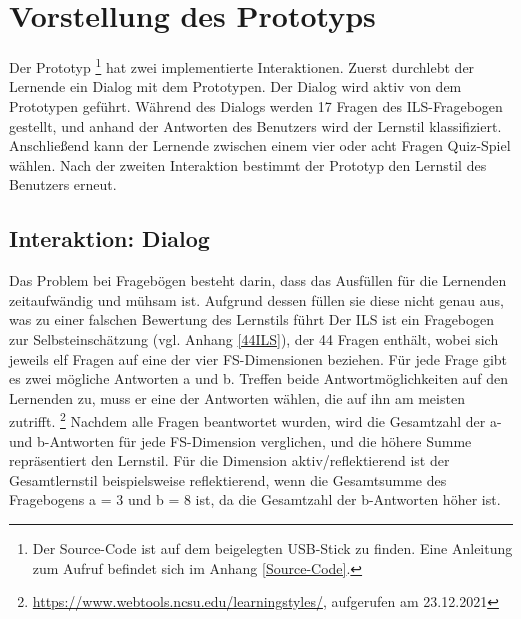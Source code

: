 \section{Vorstellung des Prototyps}  \label{VorstellungPrototyp}

Der Prototyp \footnote{Der Source-Code ist auf dem beigelegten USB-Stick zu finden. Eine Anleitung zum Aufruf befindet sich im  Anhang \ref{Source-Code}.} hat zwei implementierte Interaktionen. Zuerst durchlebt der Lernende ein Dialog mit dem Prototypen.
Der Dialog wird aktiv von dem Prototypen geführt. Während des Dialogs werden 17 Fragen des ILS-Fragebogen gestellt, und 
anhand der Antworten des Benutzers wird der Lernstil klassifiziert. 
Anschließend kann der Lernende zwischen einem vier oder acht Fragen Quiz-Spiel wählen. Nach der zweiten Interaktion
bestimmt der Prototyp den Lernstil des Benutzers erneut.

\subsection{Interaktion: Dialog}
Das Problem bei Fragebögen besteht darin,
dass das Ausfüllen für die Lernenden zeitaufwändig und mühsam ist.
Aufgrund dessen füllen sie diese nicht genau aus,
was zu einer falschen Bewertung 
des Lernstils führt \parencite[189 f.]{Popescu.2009}
Der ILS ist ein Fragebogen zur Selbsteinschätzung (vgl. Anhang \ref{44ILS}), 
der 44 Fragen enthält, wobei sich jeweils elf Fragen auf eine der vier FS-Dimensionen beziehen.
Für jede Frage gibt es zwei mögliche Antworten a und b. Treffen beide Antwortmöglichkeiten
auf den Lernenden zu, muss er eine der Antworten wählen, die auf ihn am meisten zutrifft. \footnote{\url{https://www.webtools.ncsu.edu/learningstyles/}, aufgerufen am 23.12.2021} 
Nachdem alle Fragen beantwortet wurden, wird die Gesamtzahl der a- und b-Antworten
für jede FS-Dimension verglichen, und die höhere Summe repräsentiert den Lernstil.
Für die Dimension aktiv/reflektierend ist der Gesamtlernstil beispielsweise 
reflektierend, wenn die Gesamtsumme des Fragebogens a = 3 und b = 8 ist,
da die Gesamtzahl der b-Antworten höher ist.  


